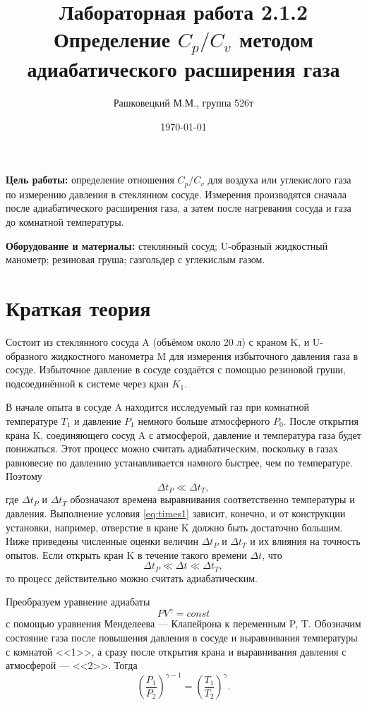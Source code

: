 \documentclass[12pt]{article}
\author{Рашковецкий М.М., группа 526т}
\date{\today}
\title{Лабораторная работа 2.1.2\\Определение $C_p/C_v$ методом адиабатического расширения газа}
\begin{document}
	\maketitle
	
	{\parindent=1cm \hangindent=1cm \parskip=0.5cm
	{\bfseries Цель работы:} определение отношения $C_p/C_v$ для воздуха или углекислого газа по измерению давления в стеклянном сосуде. Измерения производятся сначала после адиабатического расширения газа, а затем после нагревания сосуда и газа до комнатной температуры.
	
	\hangindent=1cm
	{\bfseries Оборудование и материалы:} стеклянный сосуд; U-образный жидкостный манометр; резиновая груша; газгольдер с углекислым газом.\par}
	\section*{Краткая теория}
	
	 Состоит из стеклянного сосуда A (объёмом около 20 л) с краном K, и U-образного жидкостного манометра M для измерения избыточного давления газа в сосуде. Избыточное давление в сосуде создаётся с помощью резиновой груши, подсоединённой к системе через кран $K_1$.
	
	В начале опыта в сосуде A находится исследуемый газ при комнатной температуре $T_1$ и давление $P_1$ немного больше атмосферного $P_0$. После открытия крана K, соединяющего сосуд A с атмосферой, давление и температура газа будет понижаться. Этот процесс можно считать адиабатическим, поскольку в газах равновесие по давлению устанавливается намного быстрее, чем по температуре. Поэтому
	\begin{equation}
	\label{eq:times1}
	\Delta t_P \ll \Delta t_T,
	\end{equation}
	где $\Delta t_P$ и $\Delta t_T$ обозначают времена выравнивания соответственно температуры и давления. Выполнение условия \eqref{eq:times1} зависит, конечно, и от конструкции установки, например, отверстие в кране K должно быть достаточно большим. Ниже приведены численные оценки величин $\Delta t_P$ и $\Delta t_T$ и их влияния на точность опытов. Если открыть кран K в течение такого времени $\Delta t$, что
	\begin{equation}
	\label{eq:times2}
	\Delta t_P \ll \Delta t \ll \Delta t_T,
	\end{equation}
	то процесс действительно можно считать адиабатическим.
	
	Преобразуем уравнение адиабаты
	\begin{equation}
	\label{eq:adiabate0}
	PV^\gamma=const
	\end{equation}
	с помощью уравнения Менделеева --- Клапейрона к переменным P, T. Обозначим состояние газа после повышения давления в сосуде и выравнивания температуры с комнатой <<1>>, а сразу после открытия крана и выравнивания давления с атмосферой --- <<2>>. Тогда
	\begin{equation}
	\label{eq:adiabate1}
	\left( \frac{P_1}{P_2} \right)^{\gamma-1}=\left( \frac{T_1}{T_2} \right)^\gamma.
	\end{equation}
	
\end{document}

